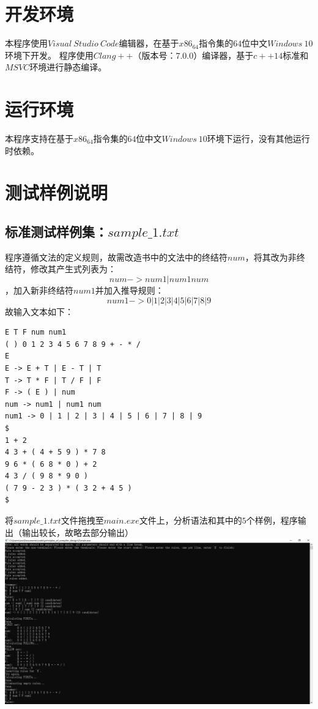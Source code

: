 \documentclass[UTF8]{ctexart}
\begin{document}
\section{开发环境}
本程序使用$Visual \ Studio \ Code$编辑器，在基于$x86_64$指令集的$64$位中文$Windows \ 10$环境下开发。
程序使用$Clang++$（版本号：$7.0.0$）编译器，基于$c++14$标准和$MSVC$环境进行静态编译。
\section{运行环境}
本程序支持在基于$x86_64$指令集的$64$位中文$Windows \ 10$环境下运行，没有其他运行时依赖。
\section{测试样例说明}
\subsection{标准测试样例集：$sample\_1.txt$}
程序遵循文法的定义规则，故需改造书中的文法中的终结符$num$，将其改为非终结符，修改其产生式列表为：
$$ num -> num1 | num1 num $$
，加入新非终结符$num1$并加入推导规则：
$$ num1 -> 0 | 1 | 2 | 3 | 4 | 5 | 6 | 7 | 8 | 9 $$
故输入文本如下：
\begin{lstlisting}
E T F num num1
( ) 0 1 2 3 4 5 6 7 8 9 + - * /
E
E -> E + T | E - T | T
T -> T * F | T / F | F
F -> ( E ) | num
num -> num1 | num1 num
num1 -> 0 | 1 | 2 | 3 | 4 | 5 | 6 | 7 | 8 | 9
$
1 + 2
4 3 + ( 4 + 5 9 ) * 7 8
9 6 * ( 6 8 * 0 ) + 2
4 3 / ( 9 8 * 9 0 )
( 7 9 - 2 3 ) * ( 3 2 + 4 5 )
$
    \end{lstlisting}
将$sample\_1.txt$文件拖拽至$main.exe$文件上，分析语法和其中的$5$个样例，程序输出（输出较长，故略去部分输出） \\
\includegraphics[width=\textwidth]{sample_1}
\end{document}
